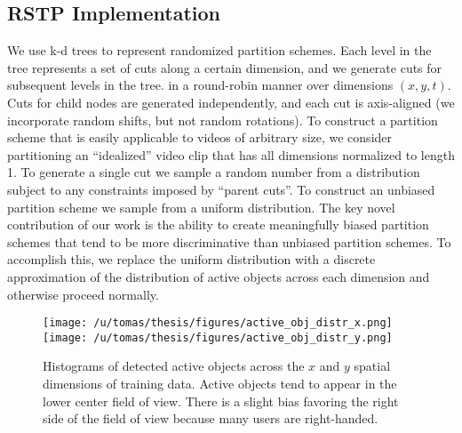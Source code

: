\documentclass{bmvc2k}
\begin{document}
  \subsection{RSTP Implementation}
	We use k-d trees to represent randomized partition schemes. Each level in the tree
	represents a set of cuts along a certain dimension, and we generate cuts
  for subsequent levels in the tree.
  in a round-robin manner over dimensions $(x, y, t)$. Cuts for child nodes are generated independently, and each cut is axis-aligned
  (we incorporate random shifts, but not random rotations).
  To construct a partition scheme that is easily applicable to videos of
  arbitrary size, we consider
  partitioning an ``idealized'' video clip that has all dimensions normalized
  to length 1. To generate a single cut we sample a random number from a
  distribution subject to any constraints imposed by ``parent cuts''. To
  construct an unbiased partition scheme we sample from a uniform
  distribution.
  The key novel contribution of our work is the ability to create
  meaningfully biased partition schemes that tend to be more discriminative
  than unbiased partition schemes.
  To accomplish this, we replace the uniform distribution with a discrete
  approximation of the distribution of active objects across each dimension
  and otherwise proceed normally.

	\begin{figure}[t]
		\begin{center}
			  \texttt{[image: /u/tomas/thesis/figures/active\_obj\_distr\_x.png]}
			  \texttt{[image: /u/tomas/thesis/figures/active\_obj\_distr\_y.png]}
		\end{center}
		   \caption{Histograms of detected active objects across the $x$ and
       $y$ spatial dimensions of training data. Active objects tend to appear in the lower
     center field of view. There is a slight bias favoring the
   right side of the field of view because many users are right-handed. }
				\label{fig:long}
				\label{fig:onecol}
	\end{figure}
	
\end{document}
